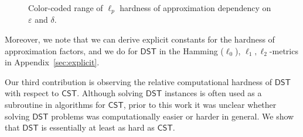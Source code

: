 \documentclass{theoretics}
\newcommand{\1}{\textbf{1}}
\newcommand{\cst}{$\mathsf{CST}$\xspace}
\newcommand{\dst}{$\mathsf{DST}$\xspace}
\begin{document}
\begin{figure}[!h]







    \caption{Color-coded range of $\ell_p$ hardness of approximation dependency on $\varepsilon$ and $\delta$.}
    \label{fig: eps delta depend}
\end{figure}

Moreover, we note that we can derive explicit constants for the hardness of approximation factors, and we do for \dst in the Hamming ($\ell_0$), $\ell_1,\ell_2$-metrics in Appendix~\ref{sec:explicit}. 



Our third contribution is observing  the relative computational hardness of \dst with respect to  \cst. Although solving \dst instances is often used as a subroutine in algorithms for \cst, prior to this work it was unclear whether solving \dst problems was computationally easier or harder in general. We show that \dst is essentially at least as hard as \cst.
\end{document}
